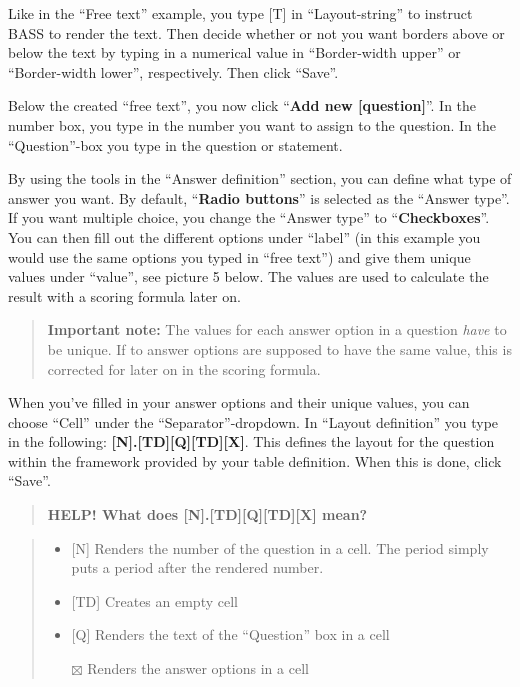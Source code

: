 \documentclass[
]{book}
\providecommand{\tightlist}{%
  \setlength{\itemsep}{0pt}\setlength{\parskip}{0pt}}
\begin{document}
Like in the ``Free text'' example, you type {[}T{]} in ``Layout-string'' to instruct BASS to render the text. Then decide whether or not you want borders above or below the text by typing in a numerical value in ``Border-width upper'' or ``Border-width lower'', respectively. Then click ``Save''.

Below the created ``free text'', you now click ``\textbf{Add new {[}question{]}}''. In the number box, you type in the number you want to assign to the question. In the ``Question''-box you type in the question or statement.

By using the tools in the ``Answer definition'' section, you can define what type of answer you want. By default, ``\textbf{Radio buttons}'' is selected as the ``Answer type''. If you want multiple choice, you change the ``Answer type'' to ``\textbf{Checkboxes}''.
You can then fill out the different options under ``label'' (in this example you would use the same options you typed in ``free text'') and give them unique values under ``value'', see picture 5 below. The values are used to calculate the result with a scoring formula later on.

\begin{quote}
\textbf{Important note:} The values for each answer option in a question \emph{have} to be unique. If to answer options are supposed to have the same value, this is corrected for later on in the scoring formula.
\end{quote}

When you've filled in your answer options and their unique values, you can choose ``Cell'' under the ``Separator''-dropdown. In ``Layout definition'' you type in the following: \textbf{{[}N{]}.{[}TD{]}{[}Q{]}{[}TD{]}{[}X{]}}. This defines the layout for the question within the framework provided by your table definition. When this is done, click ``Save''.

\begin{quote}
\textbf{HELP! What does {[}N{]}.{[}TD{]}{[}Q{]}{[}TD{]}{[}X{]} mean?}
\end{quote}

\begin{quote}
\begin{itemize}
\tightlist
\item
  {[}N{]} Renders the number of the question in a cell. The period simply puts a period after the rendered number.
\item
  {[}TD{]} Creates an empty cell
\item
  {[}Q{]} Renders the text of the ``Question'' box in a cell
\item[$\boxtimes$]
  Renders the answer options in a cell
\end{itemize}
\end{quote}
\end{document}
